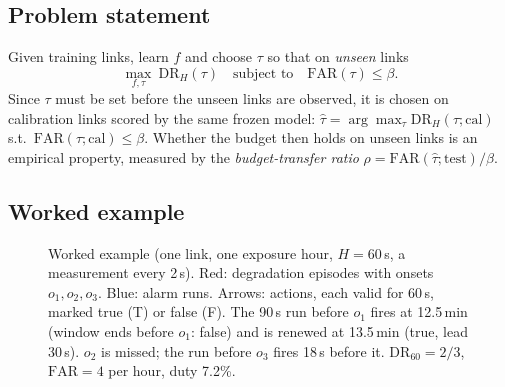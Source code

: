 \documentclass[preprint,review,12pt]{elsarticle}
\newcommand{\FAR}{\mathrm{FAR}}
\newcommand{\DR}{\mathrm{DR}}
\begin{document}
\subsection{Problem statement}
Given training links, learn $f$ and choose $\tau$ so that on \emph{unseen} links
\begin{equation}
\max_{f,\tau}\ \DR_H(\tau)\quad\text{subject to}\quad \FAR(\tau)\le\beta.
\label{eq:problem}
\end{equation}
Since $\tau$ must be set before the unseen links are observed, it is chosen on
calibration links scored by the same frozen model:
$\hat\tau=\arg\max_\tau\DR_H(\tau;\text{cal})$ s.t.\ $\FAR(\tau;\text{cal})\le\beta$.
Whether the budget then holds on unseen links is an empirical property, measured by
the \emph{budget-transfer ratio} $\rho=\FAR(\hat\tau;\text{test})/\beta$.

\subsection{Worked example}
\label{sec:example}

\begin{figure}[!htbp]
\centering
{}
\caption{Worked example (one link, one exposure hour, $H=60$\,s, a measurement every
2\,s). Red: degradation episodes with onsets $o_1,o_2,o_3$. Blue: alarm runs.
Arrows: actions, each valid for 60\,s, marked true (T) or false (F). The 90\,s run
before $o_1$ fires at 12.5\,min (window ends before $o_1$: false) and is renewed at
13.5\,min (true, lead 30\,s). $o_2$ is missed; the run before $o_3$ fires 18\,s
before it. $\DR_{60}=2/3$, $\FAR=4$ per hour, duty 7.2\%.}
\label{fig:example}
\end{figure}
\end{document}
